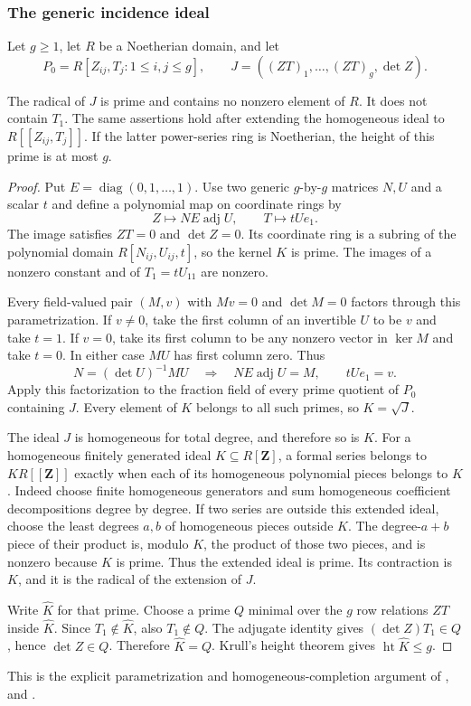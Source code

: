 \subsubsection{The generic incidence ideal}
Let $g\ge1$, let $R$ be a Noetherian domain, and let
\[
 P_0=R[Z_{ij},T_j:1\le i,j\le g],\qquad
 J=((ZT)_1,\ldots,(ZT)_g,\det Z).
\]
\begin{srlemma}\label{lem:sr-generic-incidence}
The radical of $J$ is prime and contains no nonzero element of $R$.
It does not contain $T_1$. The same assertions hold after extending
the homogeneous ideal to $R[[Z_{ij},T_j]]$.
If the latter power-series ring is Noetherian, the height of this
prime is at most $g$.
\end{srlemma}
\begin{proof}
Put $E=\operatorname{diag}(0,1,\ldots,1)$.
Use two generic $g$-by-$g$ matrices $N,U$ and a scalar $t$ and define
a polynomial map on coordinate rings by
\[
                 Z\longmapsto NE\operatorname{adj}U,\qquad
                 T\longmapsto tUe_1.
\]
The image satisfies $ZT=0$ and $\det Z=0$.
Its coordinate ring is a subring of the polynomial domain
$R[N_{ij},U_{ij},t]$, so the kernel $K$ is prime.
The images of a nonzero constant and of $T_1=tU_{11}$ are nonzero.

Every field-valued pair $(M,v)$ with $Mv=0$ and $\det M=0$
factors through this parametrization.
If $v\ne0$, take the first column of an invertible $U$ to be $v$
and take $t=1$.
If $v=0$, take its first column to be any nonzero vector in $\ker M$
and take $t=0$.
In either case $MU$ has first column zero.
Thus
\[
         N=(\det U)^{-1}MU
       \quad\Longrightarrow\quad
         NE\operatorname{adj}U=M,\qquad tUe_1=v.
\]
Apply this factorization to the fraction field of every prime quotient
of $P_0$ containing $J$.
Every element of $K$ belongs to all such primes, so $K=\sqrt J$.

The ideal $J$ is homogeneous for total degree, and therefore so is $K$.
For a homogeneous finitely generated ideal $K\subseteq R[\mathbf Z]$,
a formal series belongs to $KR[[\mathbf Z]]$ exactly when each of its
homogeneous polynomial pieces belongs to $K$.
Indeed choose finite homogeneous generators and sum homogeneous
coefficient decompositions degree by degree.
If two series are outside this extended ideal, choose the least
degrees $a,b$ of homogeneous pieces outside $K$.
The degree-$a+b$ piece of their product is, modulo $K$, the product
of those two pieces, and is nonzero because $K$ is prime.
Thus the extended ideal is prime.
Its contraction is $K$, and it is the radical of the extension of $J$.

Write $\widehat K$ for that prime.
Choose a prime $Q$ minimal over the $g$ row relations $ZT$
inside $\widehat K$.
Since $T_1\notin\widehat K$, also $T_1\notin Q$.
The adjugate identity gives $(\det Z)T_1\in Q$, hence $\det Z\in Q$.
Therefore $\widehat K=Q$.
Krull's height theorem gives $\operatorname{ht}\widehat K\le g$.
\end{proof}
This is the explicit parametrization and homogeneous-completion
argument of ,
 and .

